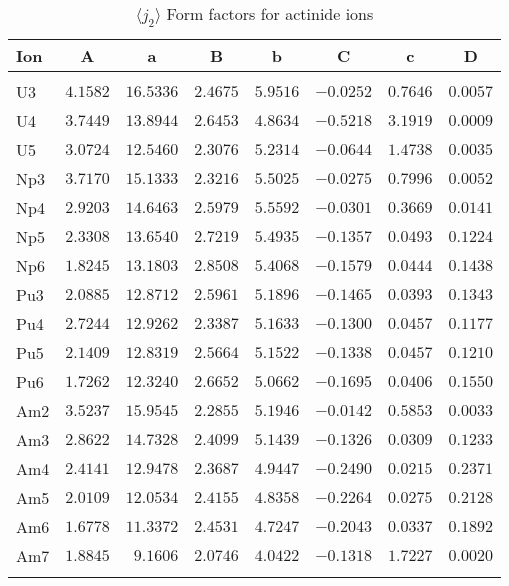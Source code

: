 \begin{table}[H]
\caption{$\langle j_2\rangle$ Form factors for actinide ions}\vspace{2mm}
\label{acj2}
{\tablesize
\begin{tabular}{lrrrrrrr}
\hline
Ion&
\multicolumn{1}{c}{A}&\multicolumn{1}{c}{a}&
\multicolumn{1}{c}{B}&\multicolumn{1}{c}{b}&
\multicolumn{1}{c}{C}&\multicolumn{1}{c}{c}&\multicolumn{1}{c}{D}\\
\hline\\[-2ex]
U3 &$4.1582$ &$16.5336$ &$2.4675$ &$5.9516$ &$-0.0252$ &$0.7646$ &$0.0057$ \\
U4 &$3.7449$ &$13.8944$ &$2.6453$ &$4.8634$ &$-0.5218$ &$3.1919$ &$0.0009$ \\
U5 &$3.0724$ &$12.5460$ &$2.3076$ &$5.2314$ &$-0.0644$ &$1.4738$ &$0.0035$ \\
Np3 &$3.7170$ &$15.1333$ &$2.3216$ &$5.5025$ &$-0.0275$ &$0.7996$ &$0.0052$ \\
Np4 &$2.9203$ &$14.6463$ &$2.5979$ &$5.5592$ &$-0.0301$ &$0.3669$ &$0.0141$ \\
Np5 &$2.3308$ &$13.6540$ &$2.7219$ &$5.4935$ &$-0.1357$ &$0.0493$ &$0.1224$ \\
Np6 &$1.8245$ &$13.1803$ &$2.8508$ &$5.4068$ &$-0.1579$ &$0.0444$ &$0.1438$ \\
Pu3 &$2.0885$ &$12.8712$ &$2.5961$ &$5.1896$ &$-0.1465$ &$0.0393$ &$0.1343$ \\
Pu4 &$2.7244$ &$12.9262$ &$2.3387$ &$5.1633$ &$-0.1300$ &$0.0457$ &$0.1177$ \\
Pu5 &$2.1409$ &$12.8319$ &$2.5664$ &$5.1522$ &$-0.1338$ &$0.0457$ &$0.1210$ \\
Pu6 &$1.7262$ &$12.3240$ &$2.6652$ &$5.0662$ &$-0.1695$ &$0.0406$ &$0.1550$ \\
Am2 &$3.5237$ &$15.9545$ &$2.2855$ &$5.1946$ &$-0.0142$ &$0.5853$ &$0.0033$ \\
Am3 &$2.8622$ &$14.7328$ &$2.4099$ &$5.1439$ &$-0.1326$ &$0.0309$ &$0.1233$ \\
Am4 &$2.4141$ &$12.9478$ &$2.3687$ &$4.9447$ &$-0.2490$ &$0.0215$ &$0.2371$ \\
Am5 &$2.0109$ &$12.0534$ &$2.4155$ &$4.8358$ &$-0.2264$ &$0.0275$ &$0.2128$ \\
Am6 &$1.6778$ &$11.3372$ &$2.4531$ &$4.7247$ &$-0.2043$ &$0.0337$ &$0.1892$ \\
Am7 &$1.8845$ &$9.1606$ &$2.0746$ &$4.0422$ &$-0.1318$ &$1.7227$ &$0.0020$ \\
\hline\\[-2ex]
\end{tabular}
}
\end{table}
